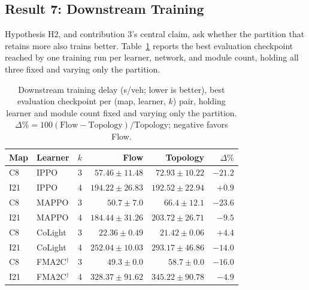 \documentclass[journal]{IEEEtran}
\theoremstyle{definition}
\begin{document}
\subsection{Result 7: Downstream Training}
\label{sec:exp-perf}

Hypothesis H2, and contribution 3's central claim, ask whether the partition that retains more also trains better. Table~\ref{tab:wait-gains} reports the best evaluation checkpoint reached by one training run per learner, network, and module count, holding all three fixed and varying only the partition.

\begin{table}[t]
    \centering
    \caption{Downstream training delay (s/veh; lower is better), best evaluation checkpoint per (map, learner, $k$) pair, holding learner and module count fixed and varying only the partition. $\Delta\%=100(\text{Flow}-\text{Topology})/\text{Topology}$; negative favors Flow.}
    \label{tab:wait-gains}
    \scriptsize
    \setlength{\tabcolsep}{2.5pt}

    \begin{tabular}{llrrrr}
        \toprule
        Map & Learner         & $k$ & Flow                      & Topology                  & $\Delta\%$       \\
        \midrule
        C8  & IPPO            & 3   & $\mathbf{57.46\pm11.48}$  & $72.93\pm10.22$           & $\mathbf{-21.2}$ \\
        I21 & IPPO            & 4   & $194.22\pm26.83$          & $\mathbf{192.52\pm22.94}$ & $+0.9$           \\
        \addlinespace
        C8  & MAPPO           & 3   & $\mathbf{50.7\pm7.0}$     & $66.4\pm12.1$             & $\mathbf{-23.6}$ \\
        I21 & MAPPO           & 4   & $\mathbf{184.44\pm31.26}$ & $203.72\pm26.71$          & $\mathbf{-9.5}$  \\
        \addlinespace
        C8  & CoLight         & 3   & $22.36\pm0.49$            & $\mathbf{21.42\pm0.06}$   & $+4.4$           \\
        I21 & CoLight         & 4   & $\mathbf{252.04\pm10.03}$ & $293.17\pm46.86$          & $-14.0$          \\
        \addlinespace
        C8  & FMA2C$^\dagger$ & 3   & $\mathbf{49.3\pm0.0}$     & $58.7\pm0.0$              & $\mathbf{-16.0}$ \\
        I21 & FMA2C$^\dagger$ & 4   & $\mathbf{328.37\pm91.62}$ & $345.22\pm90.78$          & $\mathbf{-4.9}$  \\
        \bottomrule
    \end{tabular}
\end{table}
\end{document}
